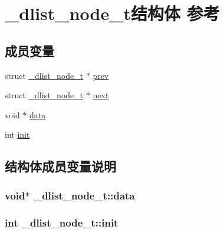 \hypertarget{a00007}{}\section{\+\_\+dlist\+\_\+node\+\_\+t结构体 参考}
\label{a00007}
\subsection*{成员变量}
\begin{DoxyCompactItemize}
\item 
struct \hyperlink{a00007}{\+\_\+dlist\+\_\+node\+\_\+t} $\ast$ \hyperlink{a00007_aa81273afe3e8305f6ba9669c1815aa82_aa81273afe3e8305f6ba9669c1815aa82}{prev}
\item 
struct \hyperlink{a00007}{\+\_\+dlist\+\_\+node\+\_\+t} $\ast$ \hyperlink{a00007_aa5c54bdaf97510c6481c3bc45bb33411_aa5c54bdaf97510c6481c3bc45bb33411}{next}
\item 
void $\ast$ \hyperlink{a00007_af3a2021b810fa6100cec2da211c1f5f9_af3a2021b810fa6100cec2da211c1f5f9}{data}
\item 
int \hyperlink{a00007_a028979e7d24a0abae1d7261f2f48b394_a028979e7d24a0abae1d7261f2f48b394}{init}
\end{DoxyCompactItemize}


\subsection{结构体成员变量说明}
\hypertarget{a00007_af3a2021b810fa6100cec2da211c1f5f9_af3a2021b810fa6100cec2da211c1f5f9}{}
\subsubsection[{data}]{\setlength{\rightskip}{0pt plus 5cm}void$\ast$ \+\_\+dlist\+\_\+node\+\_\+t\+::data}\label{a00007_af3a2021b810fa6100cec2da211c1f5f9_af3a2021b810fa6100cec2da211c1f5f9}
\hypertarget{a00007_a028979e7d24a0abae1d7261f2f48b394_a028979e7d24a0abae1d7261f2f48b394}{}
\subsubsection[{init}]{\setlength{\rightskip}{0pt plus 5cm}int \+\_\+dlist\+\_\+node\+\_\+t\+::init}\label{a00007_a028979e7d24a0abae1d7261f2f48b394_a028979e7d24a0abae1d7261f2f48b394}
\hypertarget{a00007_aa5c54bdaf97510c6481c3bc45bb33411_aa5c54bdaf97510c6481c3bc45bb33411}{}
